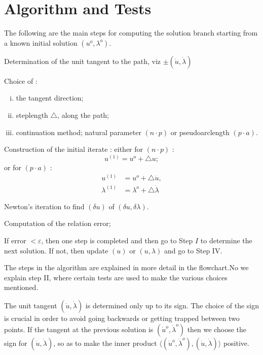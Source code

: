 \setcounter{section}{15}
\section{Algorithm and Tests}\label{chap6-sec6.16}%

The following are the main steps for computing the solution branch
starting from a known initial solution $(u^o,\lambda^o)$. 

\medskip
{}
Determination of the unit tangent to the path, viz $\pm (\dot{u},
\dot{\lambda})$ 

\medskip
{}
Choice of :
\begin{enumerate}[(i)]
\item the tangent direction;

\item steplength $\triangle$, along the path;

\item continuation method; natural parameter $(n \cdot p)$ or
  pseudoarclength $(p \cdot a)$. 
\end{enumerate}

\medskip
{}
Construction of the initial iterate :
either for $(n \cdot p)$ : 
$$
u^{(1)} = u^o + \triangle u ;
$$
or for $(p \cdot a)$ :
\begin{align*}
 u^{(1)} & = u^o + \triangle \dot{u},\\
 \lambda^{(1)} & = \lambda^o + \triangle \dot{\lambda}
\end{align*}

\medskip
{}
Newton's iteration to find $(\delta u)$ of $(\delta u, \delta
\lambda)$. 

\medskip
{}
Computation of the relation error;

If error $< \varepsilon$, then one step is completed and then go to
Step $I$ to determine the next solution. If not, then update $(u)$ or
$(u,\lambda)$ and go to Step IV.

The steps in the algorithm are explained in more detail in the
flow\-chart.\pageoriginale No we explain step II, where certain tests are used to
make the various choices mentioned. 

The unit tangent $(\dot{u}, \dot{\lambda})$ is determined only up to
its sign. The choice of the sign is crucial in order to avoid going
backwards or getting trapped between two points. If the tangent at the
previous solution is $(\dot{u}^o, \dot{\lambda}^o)$ then we choose the
sign for $( \dot{u}, \dot{\lambda})$, so as to make the inner product $\langle 
( \dot{u}^o, \dot{\lambda}^o),( \dot{u}, \dot{\lambda})\rangle$ positive.  

